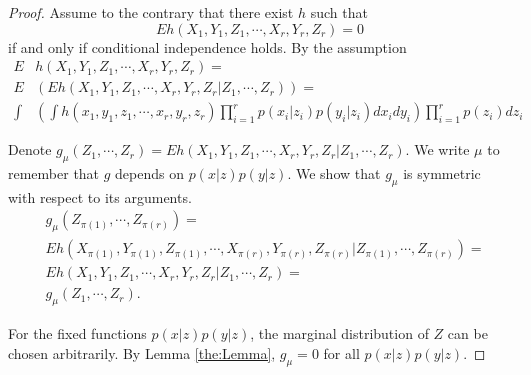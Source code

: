 \documentclass{article}
\begin{document}
\begin{proof}
Assume to the contrary that there exist $h$ such that 
$$
E h(X_1,Y_1,Z_1, \cdots, X_r,Y_r,Z_r) =0 $$ 
if and only if conditional independence holds. By the assumption  
\begin{align}
 E& h(X_1,Y_1,Z_1, \cdots, X_r,Y_r,Z_r) = \\
 E& \left( E h(X_1,Y_1,Z_1, \cdots, X_r,Y_r,Z_r | Z_1,\cdots,Z_r) \right) = \\
 \int& \left(\int h(x_1,y_1,z_1,\cdots, x_r,y_r,z_r) \prod_{i=1}^r p(x_i|z_i)p(y_i|z_i) dx_i dy_i  \right)  \prod_{i=1}^r p(z_i)dz_i
\end{align}

Denote $g_{\mu}( Z_1,\cdots,Z_r) = E h(X_1,Y_1,Z_1, \cdots, X_r,Y_r,Z_r | Z_1,\cdots,Z_r)$. We write $\mu$ to remember that $g$ depends on $p(x|z)p(y|z)$. We show that $g_{\mu}$ is symmetric with respect to its arguments. 
\begin{align}
&g_{\mu}(Z_{\pi(1)}, \cdots,Z_{\pi(r)} )  = \\ 
&E h(X_{\pi(1)},Y_{\pi(1)},Z_{\pi(1)}, \cdots, X_{\pi(r)},Y_{\pi(r)},Z_{\pi(r)} | Z_{\pi(1)},\cdots,Z_{\pi(r)}) = \\
&E h(X_1,Y_1,Z_1, \cdots, X_r,Y_r,Z_r | Z_1,\cdots,Z_r) = \\
&g_{\mu}(Z_1, \cdots,Z_r ). 
\end{align}

For the fixed functions $p(x|z)p(y|z)$, the marginal distribution of $Z$ can be chosen  arbitrarily.   By Lemma \ref{the:Lemma}, $g_{\mu}=0$ for all $p(x|z)p(y|z)$.  


\end{proof}
\end{document}
